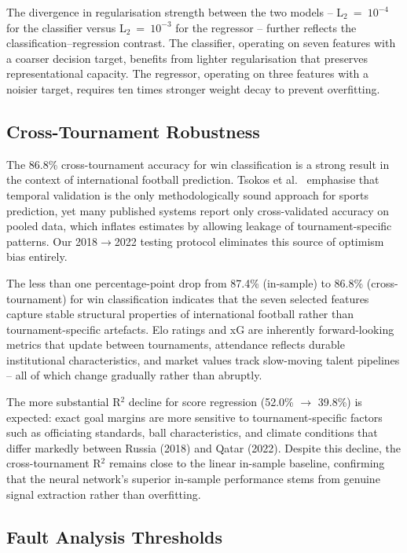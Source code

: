 \documentclass[a4paper,twoside]{article}
\begin{document}
The divergence in regularisation strength between the two models -- L$_{2}$~=~$10^{-4}$ for the classifier versus L$_{2}$~=~$10^{-3}$ for the regressor -- further reflects the classification--regression contrast.
The classifier, operating on seven features with a coarser decision target, benefits from lighter regularisation that preserves representational capacity.
The regressor, operating on three features with a noisier target, requires ten times stronger weight decay to prevent overfitting.

\subsection{Cross-Tournament Robustness}

The 86.8\% cross-tournament accuracy for win classification is a strong result in the context of international football prediction.
Tsokos et al.\ \cite{tsokos_modeling_2019} emphasise that temporal validation is the only methodologically sound approach for sports prediction, yet many published systems report only cross-validated accuracy on pooled data, which inflates estimates by allowing leakage of tournament-specific patterns.
Our 2018$\to$2022 testing protocol eliminates this source of optimism bias entirely.

The less than one percentage-point drop from 87.4\% (in-sample) to 86.8\% (cross-tournament) for win classification indicates that the seven selected features capture stable structural properties of international football rather than tournament-specific artefacts.
Elo ratings and xG are inherently forward-looking metrics that update between tournaments, attendance reflects durable institutional characteristics, and market values track slow-moving talent pipelines -- all of which change gradually rather than abruptly.

The more substantial R$^{2}$ decline for score regression (52.0\% $\to$ 39.8\%) is expected: exact goal margins are more sensitive to tournament-specific factors such as officiating standards, ball characteristics, and climate conditions that differ markedly between Russia (2018) and Qatar (2022).
Despite this decline, the cross-tournament R$^{2}$ remains close to the linear in-sample baseline, confirming that the neural network's superior in-sample performance stems from genuine signal extraction rather than overfitting.

\subsection{Fault Analysis Thresholds}
\end{document}
